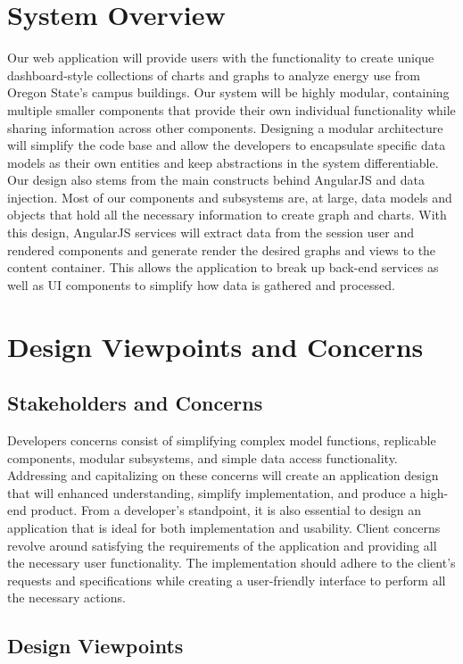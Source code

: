 \documentclass[journal,10pt,onecolumn,compsoc]{IEEEtran}
\begin{document}
    \section{System Overview} 
    Our web application will provide users with the functionality to create unique dashboard-style collections of charts and graphs to analyze energy use from Oregon State's campus buildings. Our system will be highly modular, containing multiple smaller components that provide their own individual functionality while sharing information across other components. Designing a modular architecture will simplify the code base and allow the developers to encapsulate specific data models as their own entities and keep abstractions in the system differentiable.\\
    \noindent Our design also stems from the main constructs behind AngularJS and data injection. Most of our components and subsystems are, at large, data models and objects that hold all the necessary information to create graph and charts. With this design, AngularJS services will extract data from the session user and rendered components and generate render the desired graphs and views to the content container. This allows the application to break up back-end services as well as UI components to simplify how data is gathered and processed.
    \section{Design Viewpoints and Concerns}
    \subsection{Stakeholders and Concerns}
    Developers concerns consist of simplifying complex model functions, replicable components, modular subsystems, and simple data access functionality. Addressing and capitalizing on these concerns will create an application design that will enhanced understanding, simplify implementation, and produce a high-end product. From a developer's standpoint, it is also essential to design an application that is ideal for both implementation and usability.
    \noindent Client concerns revolve around satisfying the requirements of the application and providing all the necessary user functionality. The implementation should adhere to the client's requests and specifications while creating a user-friendly interface to perform all the necessary actions.
    \subsection{Design Viewpoints}
\end{document}
